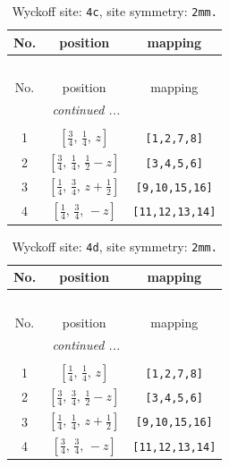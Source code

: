 \documentclass[fleqn,8pt]{jsarticle}
\begin{document}
\renewcommand{\arraystretch}{1.2}
\begin{longtable}{ccc}
\caption{Wyckoff site: {\tt 4c}, site symmetry: {\tt 2mm.}}
 \\
 \hline \hline
No. & position & mapping \\ \hline \endfirsthead

\multicolumn{2}{l}{\tablename\ \thetable{}} \\
 \hline \hline
No. & position & mapping \\ \hline \endhead

 \hline \hline
\multicolumn{2}{r}{\footnotesize\it continued ...} \\ \endfoot

 \hline \hline
\multicolumn{2}{r}{} \\ \endlastfoot

1 & $\left[ \frac{3}{4},\, \frac{1}{4},\, z \right]$ & {\tt [1,2,7,8]} \\ \hline
2 & $\left[ \frac{3}{4},\, \frac{1}{4},\, \frac{1}{2} - z \right]$ & {\tt [3,4,5,6]} \\ \hline
3 & $\left[ \frac{1}{4},\, \frac{3}{4},\, z + \frac{1}{2} \right]$ & {\tt [9,10,15,16]} \\ \hline
4 & $\left[ \frac{1}{4},\, \frac{3}{4},\, - z \right]$ & {\tt [11,12,13,14]} \\
\end{longtable}
\renewcommand{\arraystretch}{1.2}
\begin{longtable}{ccc}
\caption{Wyckoff site: {\tt 4d}, site symmetry: {\tt 2mm.}}
 \\
 \hline \hline
No. & position & mapping \\ \hline \endfirsthead

\multicolumn{2}{l}{\tablename\ \thetable{}} \\
 \hline \hline
No. & position & mapping \\ \hline \endhead

 \hline \hline
\multicolumn{2}{r}{\footnotesize\it continued ...} \\ \endfoot

 \hline \hline
\multicolumn{2}{r}{} \\ \endlastfoot

1 & $\left[ \frac{1}{4},\, \frac{1}{4},\, z \right]$ & {\tt [1,2,7,8]} \\ \hline
2 & $\left[ \frac{3}{4},\, \frac{3}{4},\, \frac{1}{2} - z \right]$ & {\tt [3,4,5,6]} \\ \hline
3 & $\left[ \frac{1}{4},\, \frac{1}{4},\, z + \frac{1}{2} \right]$ & {\tt [9,10,15,16]} \\ \hline
4 & $\left[ \frac{3}{4},\, \frac{3}{4},\, - z \right]$ & {\tt [11,12,13,14]} \\
\end{longtable}
\end{document}
